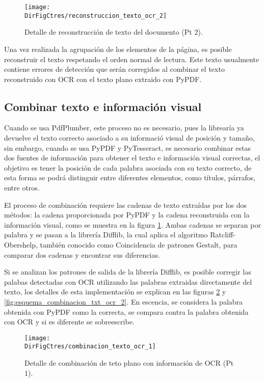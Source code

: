 \begin{figure}[]
    \centering
    \texttt{[image: \\DirFigCtres/reconstruccion\_texto\_ocr\_2]}
    \caption{Detalle de reconstrucción de texto del documento (Pt 2).}
    \label{fig:reconstruccion_texto_2}
\end{figure}

Una vez realizada la agrupación de los elementos de la página, es posible reconstruir
el texto respetando el orden normal de lectura. Este texto usualmente contiene
errores de detección que serán corregidos al combinar el texto reconstruido
con OCR con el texto plano extraido con PyPDF.

\subsection{Combinar texto e información visual}

Cuando se usa PdfPlumber, este proceso no es necesario, pues la librearía ya
devuelve el texto correcto asociado a su informació visual de posición y tamaño,
sin embargo, cuando se usa PyPDF y PyTesseract, es necesario combinar estas dos
fuentes de información para obtener el texto e información visual correctas,
el objetivo es tener la posición de cada palabra asociada con su texto correcto,
de esta forma se podrá distinguir entre diferentes elementos, como títulos,
párrafos, entre otros.

El proceso de combinación requiere las cadenas de texto extraídas por los dos métodos:
la cadena proporcionada por PyPDF y la cadena reconstruida con la información
visual, como se muestra en la figura \ref{fig:reconstruccion_texto_2}. Ambas cadenas se
separan por palabra y se pasan a la librería Difflib, la cual aplica el algoritmo
Ratcliff-Obershelp, también conocido como Coincidencia de patrones Gestalt, para
comparar dos cadenas y encontrar sus diferencias.

Si se analizan los patrones de salida de la librería Difflib, es posible
corregir las palabas detectadas con OCR utilizando las palabras extraidas directamente
del texto, los detalles de esta implementación se explican en las figuras
\ref{fig:esquema_combinacion_txt_ocr_1} y \ref{fig:esquema_combinacion_txt_ocr_2}.
En escencia, se considera la palabra obtenida con PyPDF como la correcta,
se compara contra la palabra obtenida con OCR y si es diferente se sobreescribe.

\begin{figure}[]
    \centering
    \texttt{[image: \\DirFigCtres/combinacion\_texto\_ocr\_1]}
    \caption{Detalle de combinación de teto plano con información de OCR (Pt 1).}
    \label{fig:esquema_combinacion_txt_ocr_1}
\end{figure}


